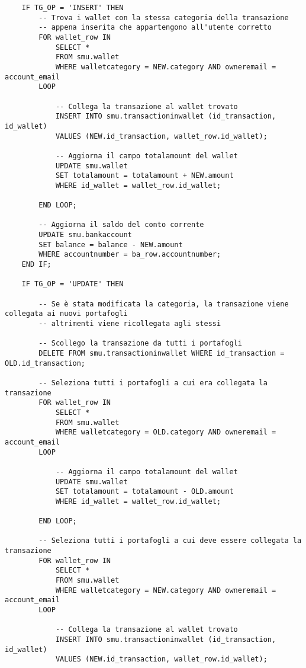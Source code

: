 \begin{lstlisting}
    IF TG_OP = 'INSERT' THEN
        -- Trova i wallet con la stessa categoria della transazione
        -- appena inserita che appartengono all'utente corretto
        FOR wallet_row IN
            SELECT *
            FROM smu.wallet
            WHERE walletcategory = NEW.category AND owneremail = account_email
        LOOP

            -- Collega la transazione al wallet trovato
            INSERT INTO smu.transactioninwallet (id_transaction, id_wallet)
            VALUES (NEW.id_transaction, wallet_row.id_wallet);

            -- Aggiorna il campo totalamount del wallet
            UPDATE smu.wallet
            SET totalamount = totalamount + NEW.amount
            WHERE id_wallet = wallet_row.id_wallet;

        END LOOP;

        -- Aggiorna il saldo del conto corrente
        UPDATE smu.bankaccount
        SET balance = balance - NEW.amount
        WHERE accountnumber = ba_row.accountnumber;
    END IF;

    IF TG_OP = 'UPDATE' THEN

        -- Se è stata modificata la categoria, la transazione viene collegata ai nuovi portafogli
        -- altrimenti viene ricollegata agli stessi

        -- Scollego la transazione da tutti i portafogli
        DELETE FROM smu.transactioninwallet WHERE id_transaction = OLD.id_transaction;
        
        -- Seleziona tutti i portafogli a cui era collegata la transazione
        FOR wallet_row IN
            SELECT *
            FROM smu.wallet
            WHERE walletcategory = OLD.category AND owneremail = account_email
        LOOP

            -- Aggiorna il campo totalamount del wallet
            UPDATE smu.wallet
            SET totalamount = totalamount - OLD.amount
            WHERE id_wallet = wallet_row.id_wallet;

        END LOOP;

        -- Seleziona tutti i portafogli a cui deve essere collegata la transazione
        FOR wallet_row IN
            SELECT *
            FROM smu.wallet
            WHERE walletcategory = NEW.category AND owneremail = account_email
        LOOP

            -- Collega la transazione al wallet trovato
            INSERT INTO smu.transactioninwallet (id_transaction, id_wallet)
            VALUES (NEW.id_transaction, wallet_row.id_wallet);


\end{lstlisting}
